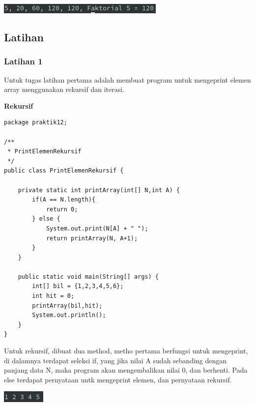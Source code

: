 \documentclass[a4paper,12pt]{article}
\begin{document}
\begin{center}
    \includegraphics[scale=1]{3.png} 
\end{center}

\newpage

\subsection{Latihan}
\subsubsection{Latihan 1}

Untuk tugas latihan pertama adalah membuat program untuk mengeprint elemen array menggunakan rekursif dan iterasi.

\textbf{Rekursif\\}
\begin{lstlisting}
package praktik12;

/**
 * PrintElemenRekursif
 */
public class PrintElemenRekursif {

    private static int printArray(int[] N,int A) {
        if(A == N.length){
            return 0;
        } else {
            System.out.print(N[A] + " ");
            return printArray(N, A+1);
        }
    }

    public static void main(String[] args) {
        int[] bil = {1,2,3,4,5,6};
        int hit = 0;
        printArray(bil,hit);
        System.out.println();
    }
}
\end{lstlisting}
Untuk rekursif, dibuat dua method, metho pertama berfungsi untuk mengeprint, di dalamnya terdapat seleksi if, yang jika
nilai A sudah sebanding dengan panjang data N, maka program akan mengembalikan nilai 0, dan berhenti. Pada else terdapat
pernyataan untk mengeprint elemen, dan pernyataan rekursif.
\begin{center}
    \includegraphics[scale=1]{4.png} 
\end{center}
\end{document}
